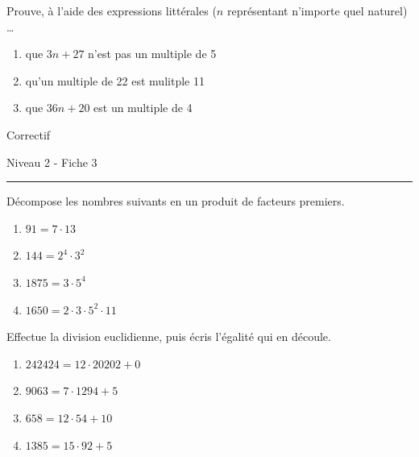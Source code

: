 \documentclass[12pt,parskip=half-, twoside=semi]{scrartcl}
\begin{document}
      \begin{exercise}
        Prouve, à l'aide des expressions littérales (\(n\) représentant n'importe quel naturel) \dots 
        \begin{enumerate}
          \item que \(3n + 27\) n'est pas un multiple de 5
          \item qu'un multiple de 22 est mulitple 11 
          \item que \(36n + 20\) est un multiple de 4
        \end{enumerate}
      \end{exercise}

\newpage
\begin{center}
  \bfseries
  \begin{Huge}
    Correctif
  \end{Huge}
  \smallbreak
  \begin{large}
    Niveau 2  - Fiche 3
  \end{large}
  \smallbreak
  \rule[10pt]{.5\linewidth}{1 pt}
\end{center}

\setcounter{exercise}{0}
      
      \begin{exercise}
        Décompose les nombres suivants en un produit de facteurs premiers.
          \begin{enumerate}[cols=2]
            \item $91 = 7 \cdot 13$
            \item $144 = 2^4 \cdot 3^2$
            \item $1875 = 3 \cdot 5^4$
            \item $1650 = 2 \cdot 3 \cdot 5^2 \cdot 11$
          \end{enumerate}
      \end{exercise}
      
      \begin{exercise}
        Effectue la division euclidienne, puis écris l'égalité qui en découle. 
          \begin{enumerate}[cols=2]
            \item $242424=12\cdot20202+0$
            \item $9063=7\cdot1294+5$
            \item $658=12\cdot54+10$
            \item $1385=15\cdot92+5$
          \end{enumerate}
      \end{exercise}
      
\end{document}
